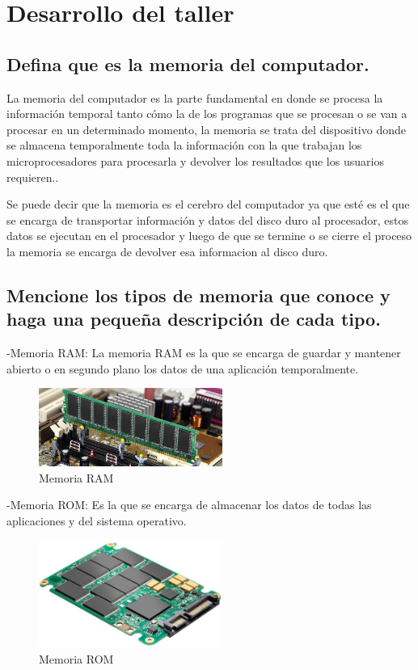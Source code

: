 \documentclass{article}
\begin{document}
\section{Desarrollo del taller} \label{contenido}

\subsection{Defina que es la memoria del computador.}
La memoria del computador es la parte fundamental en donde se procesa la información temporal tanto cómo la de los programas que se procesan o se van a procesar en un determinado momento, la memoria se trata del dispositivo donde se almacena temporalmente toda la información con la que trabajan los microprocesadores para procesarla y devolver los resultados que los usuarios requieren..

Se puede decir que la memoria es el cerebro del computador ya que esté es el que se encarga de transportar información y datos del disco duro al procesador, estos datos se ejecutan en el procesador y luego de que se termine o se cierre el proceso la memoria se encarga de devolver esa informacion al disco duro.

\subsection{Mencione los tipos de memoria que conoce y haga una pequeña descripción de cada tipo.}
-Memoria RAM: La memoria RAM es la que se encarga de guardar y mantener abierto o en segundo plano los datos de una aplicación temporalmente.\newline

\begin{figure}[h]
\includegraphics[width=6cm]{Memoria.jpg}
\centering
\caption{Memoria RAM}
\end{figure}

-Memoria ROM: Es la que se encarga de almacenar los datos de todas las aplicaciones y del sistema operativo.\newline

\begin{figure}[h]
\includegraphics[width=6cm]{ssd.jpg}
\centering
\caption{Memoria ROM}
\end{figure}
\end{document}

